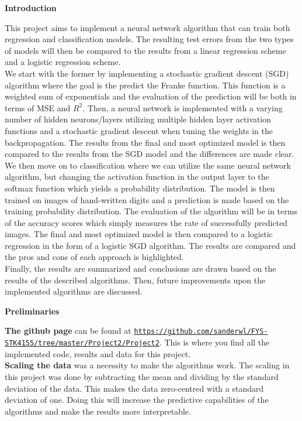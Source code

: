 \documentclass[12pt,a4paper]{article}
\begin{document}
\newpage

\begin{center}
\Large{\textbf{Introduction}}
\end{center}

\noindent This project aims to implement a neural network algorithm that can train both regression and classification models. The resulting test errors from the two types of models will then be compared to the results from a linear regression scheme and a logistic regression scheme. 
\\
We start with the former by implementing a stochastic gradient descent (SGD) algorithm where the goal is the predict the Franke function. This function is a weighted sum of exponentials and the evaluation of the prediction will be both in terms of MSE and $R^2$. Then, a neural network is implemented with a varying number of hidden neurons/layers utilizing multiple hidden layer activation functions and a stochastic gradient descent when tuning the weights in the backpropagation. The results from the final and most optimized model is then compared to the results from the SGD model and the differences are made clear.
\\
We then move on to classification where we can utilize the same neural network algorithm, but changing the activation function in the output layer to the softmax function which yields a probability distribution. The model is then trained on images of hand-written digits and a prediction is made based on the training probability distribution. The evaluation of the algorithm will be in terms of the accuracy scores which simply measures the rate of successfully predicted images. The final and most optimized model is then compared to a logistic regression in the form of a logistic SGD algorithm. The results are compared and the pros and cons of each approach is highlighted.
\\
Finally, the results are summarized and conclusions are drawn based on the results of the described algorithms. Then, future improvements upon the implemented algorithms are discussed.

\newpage

\begin{center}
\Large{\textbf{Preliminaries}}
\end{center}

\noindent \textbf{The github page} can be found at \href{{https://github.com/sanderwl/FYS-STK4155/tree/master/Project2/Project2}}{\nolinkurl{https://github.com/sanderwl/FYS-STK4155/tree/master/Project2/Project2}}. This is where you find all the implemented code, results and data for this project.
\\
\textbf{Scaling the data} was a necessity to make the algorithms work. The scaling in this project was done by subtracting the mean and dividing by the standard deviation of the data. This makes the data zero-centred with a standard deviation of one. Doing this will increase the predictive capabilities of the algorithms and make the results more interpretable.
\end{document}
